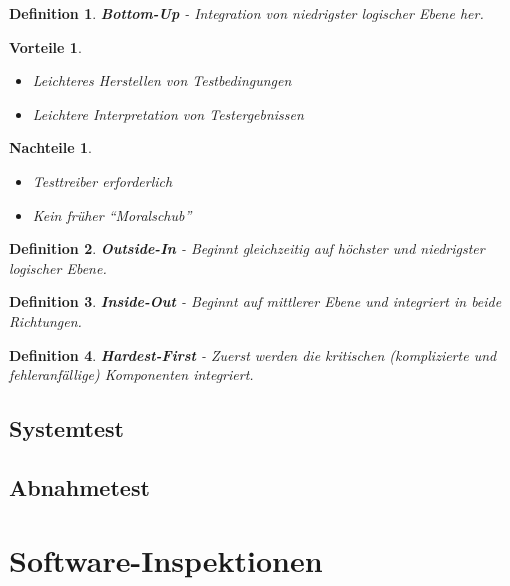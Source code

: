 \documentclass[a4paper]{article}
\theoremstyle{break}
\newtheorem{defi}{Definition}[section]
\newtheorem{why}{Vorteile}[section]
\newtheorem{whynot}{Nachteile}[section]
\begin{document}
          \begin{defi}
            \textbf{Bottom-Up} - Integration von niedrigster logischer Ebene her.
          \end{defi}
          \begin{why}
            \begin{itemize}
            \item Leichteres Herstellen von Testbedingungen
            \item Leichtere Interpretation von Testergebnissen
            \end{itemize}
          \end{why}
          \begin{whynot}
            \begin{itemize}
            \item Testtreiber erforderlich
            \item Kein früher ``Moralschub''
            \end{itemize}
          \end{whynot}
            

          \begin{defi}
            \textbf{Outside-In} - Beginnt gleichzeitig auf höchster und niedrigster logischer Ebene.
          \end{defi}

          \begin{defi}
            \textbf{Inside-Out} - Beginnt auf mittlerer Ebene und integriert in beide Richtungen.
          \end{defi}

          \begin{defi}
            \textbf{Hardest-First} - Zuerst werden die kritischen (komplizierte und fehleranfällige) Komponenten integriert.
          \end{defi}

          
          

          

          \subsection{Systemtest}
          \subsection{Abnahmetest}
          \section{Software-Inspektionen}
\end{document}
